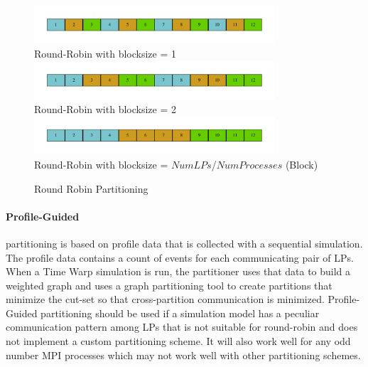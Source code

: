 \documentclass[11pt]{book}
\begin{document}
\begin{figure}
  \begin{center}
    \includegraphics[width=0.8\textwidth,keepaspectratio,quiet]{figs/graphviz/round_robin_partitioning.pdf} \\
    Round-Robin with blocksize = 1 \\
    \includegraphics[width=0.8\textwidth,keepaspectratio,quiet]{figs/graphviz/block_rr_partitioning.pdf} \\
    Round-Robin with blocksize = 2 \\
    \includegraphics[width=0.8\textwidth,keepaspectratio,quiet]{figs/graphviz/block_partitioning.pdf} \\
    Round-Robin with blocksize = $NumLPs$/$NumProcesses$ (Block) \\
  \end{center}
  \caption{Round Robin Partitioning}\label{round_robin_partitioning}
\end{figure}

\paragraph{Profile-Guided} partitioning is based on profile data that is collected with a
sequential simulation.  The profile data contains a count of events for each communicating pair of
LPs.  When a Time Warp simulation is run, the partitioner uses that data to build a weighted graph
and uses a graph partitioning tool to create partitions that minimize the cut-set so that
cross-partition communication is minimized.  Profile-Guided partitioning should be used if a
simulation model has a peculiar communication pattern among LPs that is not suitable for round-robin
and does not implement a custom partitioning scheme.  It will also work well for any odd number MPI
processes which may not work well with other partitioning schemes.
\end{document}

